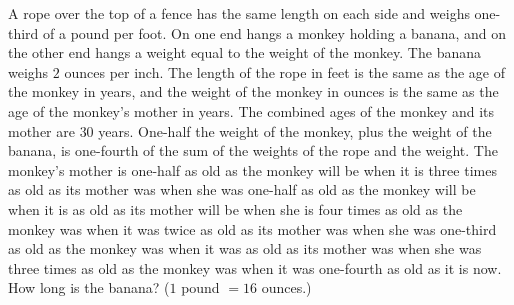 A rope over the top of a fence has the same length on each side and weighs one-third of a pound per foot. On one end hangs a monkey holding a banana, and on the other end hangs a weight equal to the weight of the monkey. The banana weighs $2$ ounces per inch. The length of the rope in feet is the same as the age of the monkey in years, and the weight of the monkey in ounces is the same as the age of the monkey's mother in years. The combined ages of the monkey and its mother are $30$ years. One-half the weight of the monkey, plus the weight of the banana, is one-fourth of the sum of the weights of the rope and the weight. The monkey's mother is one-half as old as the monkey will be when it is three times as old as its mother was when she was one-half as old as the monkey will be when it is as old as its mother will be when she is four times as old as the monkey was when it was twice as old as its mother was when she was one-third as old as the monkey was when it was as old as its mother was when she was three times as old as the monkey was when it was one-fourth as old as it is now. How long is the banana? ($1$ pound $=16$ ounces.)
